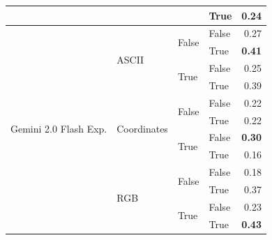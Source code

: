 \begin{tabular}{@{}llllr@{}}
                                                &                                   &                           & True                      & 0.24 \\
    \midrule
    \multirow[c]{13}{*}{Gemini 2.0 Flash Exp.}  & \multirow[c]{4}{*}{ASCII}         & \multirow[c]{2}{*}{False} & False                     & 0.27 \\
                                                &                                   &                           & True                      & \textbf{0.41} \\
                                                &                                   & \multirow[c]{2}{*}{True}  & False                     & 0.25 \\
                                                &                                   &                           & True                      & 0.39 \\
    \cmidrule{2-5}                                                                                                                             
                                                & \multirow[c]{4}{*}{Coordinates}   & \multirow[c]{2}{*}{False} & False                     & 0.22 \\
                                                &                                   &                           & True                      & 0.22 \\
                                                &                                   & \multirow[c]{2}{*}{True}  & False                     & \textbf{0.30} \\
                                                &                                   &                           & True                      & 0.16 \\
    \cmidrule{2-5}                                                                                                                             
                                                & \multirow[c]{4}{*}{RGB}           & \multirow[c]{2}{*}{False} & False                     & 0.18 \\
                                                &                                   &                           & True                      & 0.37 \\
                                                &                                   & \multirow[c]{2}{*}{True}  & False                     & 0.23 \\
                                                &                                   &                           & True                      & \textbf{0.43} \\
                                            
   \bottomrule
\end{tabular}
